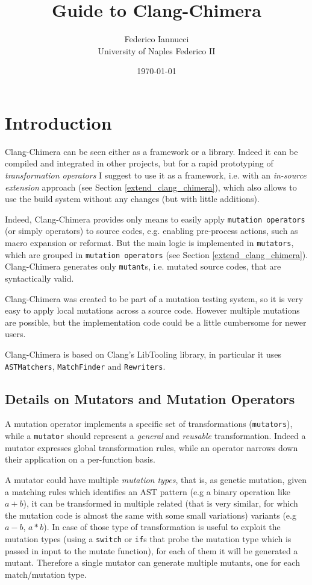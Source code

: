 \documentclass[10pt,a4paper]{article}
\title{Guide to Clang-Chimera}
\date{\today}
\author{Federico Iannucci\\University of Naples Federico II}
\begin{document}
\maketitle
\newpage
\tableofcontents
\newpage

\section{Introduction}
Clang-Chimera can be seen either as a framework or a library. Indeed it can be compiled and integrated in other projects, but for a rapid prototyping of \textit{transformation operators} I suggest to use it as a framework, i.e. with an \textit{in-source extension} approach (see Section \ref{extend_clang_chimera}), which also allows to use the build system without any changes (but with little additions).

Indeed, Clang-Chimera provides only means to easily apply \texttt{mutation operators} (or simply operators) to source codes, e.g. enabling pre-process actions, such as macro expansion or reformat. But the main logic is implemented in \texttt{mutators}, which are grouped in \texttt{mutation operators} (see Section \ref{extend_clang_chimera}). Clang-Chimera generates only \texttt{mutant}s, i.e. mutated source codes, that are syntactically valid.

Clang-Chimera was created to be part of a mutation testing system, so it is very easy to apply local mutations across a source code. However multiple mutations are possible, but the implementation code could be a little cumbersome for newer users.

Clang-Chimera is based on Clang's LibTooling library, in particular it uses \texttt{ASTMatchers}, \texttt{MatchFinder} and \texttt{Rewriters}.

\subsection{Details on Mutators and Mutation Operators}
A mutation operator implements a specific set of transformations (\texttt{mutators}), while a \texttt{mutator} should represent a \textit{general} and \textit{reusable} transformation. Indeed a mutator expresses global transformation rules, while an operator narrows down their application on a per-function basis.

A mutator could have multiple \textit{mutation types}, that is, as genetic mutation, given a matching rules which identifies an AST pattern (e.g a binary operation like $a + b$), it can be transformed in multiple related (that is very similar, for which the mutation code is almost the same with some small variations) variants (e.g $a - b$, $a * b$). In case of those type of transformation is useful to exploit the mutation types (using a \texttt{switch} or \texttt{if}s that probe the mutation type which is passed in input to the mutate function), for each of them it will be generated a mutant. Therefore a single mutator can generate multiple mutants, one for each match/mutation type.
\end{document}
